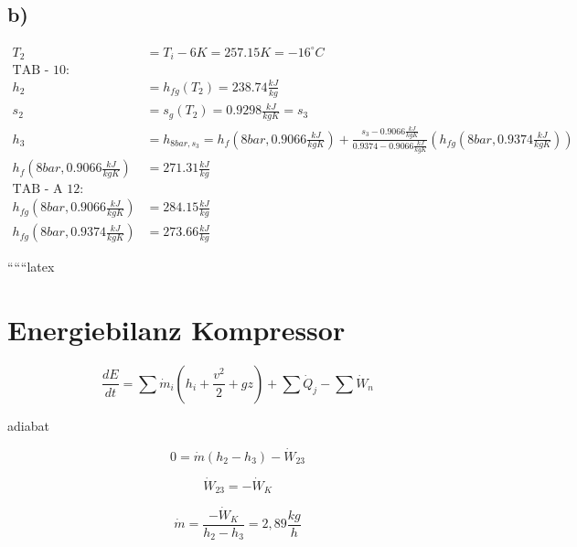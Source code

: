 

\subsection*{b)}

\begin{align*}
    T_2 &= T_i - 6K = 257.15K = -16^\circ C \\
    \text{TAB - 10:} \\
    h_{2} &= h_{fg}(T_2) = 238.74 \frac{kJ}{kg} \\
    s_{2} &= s_{g}(T_2) = 0.9298 \frac{kJ}{kgK} = s_{3} \\
    h_{3} &= h_{8bar, s_3} = h_{f}(8bar, 0.9066 \frac{kJ}{kgK}) + \frac{s_3 - 0.9066 \frac{kJ}{kgK}}{0.9374 - 0.9066 \frac{kJ}{kgK}} \left( h_{fg}(8bar, 0.9374 \frac{kJ}{kgK}) \right) \\
    h_{f}(8bar, 0.9066 \frac{kJ}{kgK}) &= 271.31 \frac{kJ}{kg} \\
    \text{TAB - A 12:} \\
    h_{fg}(8bar, 0.9066 \frac{kJ}{kgK}) &= 284.15 \frac{kJ}{kg} \\
    h_{fg}(8bar, 0.9374 \frac{kJ}{kgK}) &= 273.66 \frac{kJ}{kg}
\end{align*}

``````latex


\section*{Energiebilanz Kompressor}

\begin{equation*}
\frac{dE}{dt} = \sum \dot{m}_i \left( h_i + \frac{v^2}{2} + g z \right) + \sum \dot{Q}_j - \sum \dot{W}_n
\end{equation*}

adiabat

\begin{equation*}
0 = \dot{m} (h_2 - h_3) - \dot{W}_{23}
\end{equation*}

\begin{equation*}
\dot{W}_{23} = -\dot{W}_K
\end{equation*}

\begin{equation*}
\dot{m} = \frac{-\dot{W}_K}{h_2 - h_3} = 2,89 \frac{kg}{h}
\end{equation*}